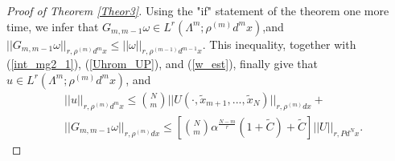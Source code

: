 \documentclass[12pt,leqno]{amsart}
\numberwithin{equation}{section}
\numberwithin{theor}{section}
\numberwithin{rem}{section}
\begin{document}
\begin{proof}[Proof of Theorem \ref{Theor3}]
Using the "if" statement of the theorem one more time, we 
infer that $G_{m,m-1}\omega \in L^{r}(\Lambda^{m}; \rho^{(m)} d^{m}x)$,and $|| G_{m,m-1}\omega ||_{r,\rho^{(m)} d^{m}x}\leq ||\omega||_{r,\rho^{(m-1)} d^{m-1}x}$.  This inequality, together with (\ref{int_mg2_1}), (\ref{Uhrom_UP}), 
and (\ref{w_est}), finally give that 
$u\in L^{r}(\Lambda^{m}; \rho^{(m)} d^{m}x)$, and
\begin{equation}
\begin{split}
&|| u ||_{r,\rho^{(m)}d^{m}x} \leq \binom{N}{m} || U(\cdot,\tilde{x}_{m+1},...,\tilde{x}_N)||_{r,\rho^{(m)}dx} +\\
& || G_{m,m-1}\omega ||_{r,\rho^{(m)}dx}
\leq \left [
\binom{N}{m} \alpha^{\frac{N-m}{r}} (1+\tilde{C}) +  
\tilde{C} \right ] || U ||_{r,Pd^{N}x}.  
\end{split}
\end{equation}
\end{proof}
\end{document}
